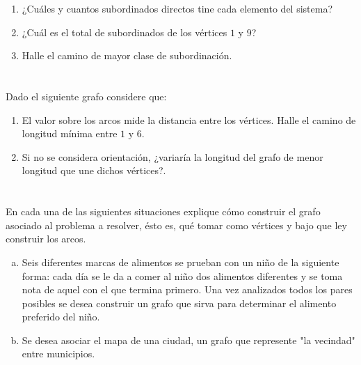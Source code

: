 \documentclass[autocontact]{gaceta}
\begin{document}
    \begin{enumerate}
        \item ¿Cuáles y cuantos subordinados directos tine cada elemento del sistema?
        \item ¿Cuál es el total de subordinados de los vértices $1$ y $9$?
        \item Halle el camino de mayor clase de subordinación.
    \end{enumerate}

    


\section{}
    Dado el siguiente grafo considere que:
    \begin{enumerate}
        \item El valor sobre los arcos mide la distancia  entre los vértices. Halle el camino 
            de longitud mínima entre $1$ y $6$.
        \item Si no se considera orientación, ¿variaría la longitud del grafo de menor longitud
            que une dichos vértices?.
    \end{enumerate}

    




\section{}
    En cada una de las siguientes situaciones explique cómo construir el grafo asociado al
    problema a resolver, ésto es, qué tomar como vértices y bajo que ley construir los 
    arcos.
    \begin{enumerate}[a)]
        \item Seis diferentes marcas de alimentos se prueban con un niño de la siguiente 
            forma: cada día se le da a comer al niño dos alimentos diferentes y se toma nota
            de aquel con el que termina primero. Una vez analizados todos los pares posibles
            se desea construir un grafo que sirva para determinar el alimento preferido del 
            niño.
        \item Se desea asociar el mapa de una ciudad, un grafo que represente "la vecindad"
            entre municipios.
    \end{enumerate}
\end{document}
